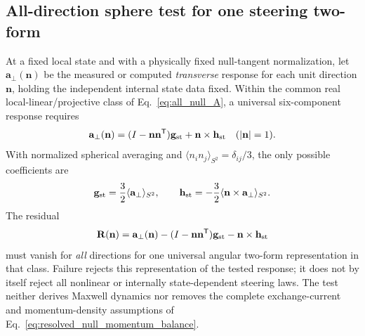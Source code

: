 \documentclass[11pt]{article}
\theoremstyle{definition}
\begin{document}
\subsection{All-direction sphere test for one steering two-form}
\label{subsec:sphere_response_test}
At a fixed local state and with a physically fixed null-tangent normalization,
let $\mathbf a_\perp(\mathbf n)$ be the measured or computed \emph{transverse}
response for each unit direction $\mathbf n$, holding the independent internal
state data fixed.  Within the common real local-linear/projective class of
Eq.~\eqref{eq:all_null_A}, a universal six-component response requires
\begin{equation}
 \mathbf a_\perp(\mathbf n)
   =(I-\mathbf n\mathbf n^{\mathsf T})\mathbf g_{\rm st}
   +\mathbf n\times\mathbf h_{\rm st}\quad (|\mathbf n|=1).
 \label{eq:sphere_response_form}
\end{equation}
With normalized spherical averaging and
$\langle n_i n_j\rangle_{S^2}=\delta_{ij}/3$, the only possible coefficients are
\begin{equation}
 \mathbf g_{\rm st}=\frac32\langle\mathbf a_\perp\rangle_{S^2},\qquad
 \mathbf h_{\rm st}=-\frac32\langle\mathbf n\times\mathbf a_\perp\rangle_{S^2}.
 \label{eq:sphere_response_reconstruction}
\end{equation}
The residual
\begin{equation}
 \mathbf R(\mathbf n)=\mathbf a_\perp(\mathbf n)
 -(I-\mathbf n\mathbf n^{\mathsf T})\mathbf g_{\rm st}
 -\mathbf n\times\mathbf h_{\rm st}
 \label{eq:sphere_response_residual}
\end{equation}
must vanish for \emph{all} directions for one universal angular two-form
representation in that class.  Failure rejects this representation of the
tested response; it does not by itself reject all nonlinear or internally
state-dependent steering laws.  The test neither derives Maxwell dynamics nor
removes the complete exchange-current and momentum-density assumptions of
Eq.~\eqref{eq:resolved_null_momentum_balance}.
\end{document}
